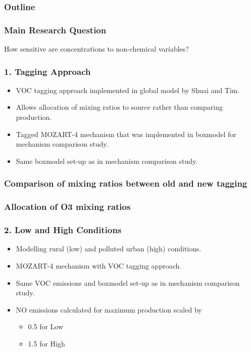 \begin{frame}
    \frametitle{Outline} 
    \tableofcontents[currentsection]
\end{frame} 

\begin{frame}
    \frametitle{Main Research Question} 

    \vspace{-0.7cm}
    \begin{center}
        \LARGE{How sensitive are  concentrations to non-chemical variables?}
    \end{center}
\end{frame}

\begin{frame}
    \frametitle{1. Tagging Approach}

    \begin{itemize}
        \item VOC tagging approach implemented in global model by Shuai and Tim.
        \item Allows allocation of  mixing ratios to source rather than comparing  production.
        \item Tagged MOZART-4 mechanism that was implemented in boxmodel for mechanism comparison study.
        \item Same boxmodel set-up as in mechanism comparison study.
    \end{itemize}
\end{frame}

\begin{frame}
    \frametitle{Comparison of mixing ratios between old and new tagging}
\end{frame}

\begin{frame}
    \frametitle{Allocation of O3 mixing ratios}
\end{frame}

\begin{frame}
    \frametitle{2. Low and High  Conditions}

    \begin{itemize}
        \item Modelling rural (low) and polluted urban (high)  conditions.
        \item MOZART-4 mechanism with VOC tagging approach.
        \item Same VOC emissions and boxmodel set-up as in mechanism comparison study.
        \item NO emissions calculated for maximum  production scaled by
            \begin{itemize}
                \item 0.5 for Low 
                \item 1.5 for High 
            \end{itemize}
    \end{itemize}
\end{frame}

